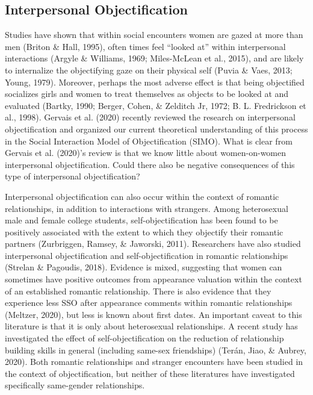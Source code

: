\documentclass[man]{apa6}
\begin{document}
\subsection{Interpersonal
Objectification}\label{interpersonal-objectification}

Studies have shown that within social encounters women are gazed at more
than men (Briton \& Hall, 1995), often times feel \enquote{looked at}
within interpersonal interactions (Argyle \& Williams, 1969;
Miles-McLean et al., 2015), and are likely to internalize the
objectifying gaze on their physical self (Puvia \& Vaes, 2013; Young,
1979). Moreover, perhaps the most adverse effect is that being
objectified socializes girls and women to treat themselves as objects to
be looked at and evaluated (Bartky, 1990; Berger, Cohen, \& Zelditch Jr,
1972; B. L. Fredrickson et al., 1998). Gervais et al. (2020) recently
reviewed the research on interpersonal objectification and organized our
current theoretical understanding of this process in the Social
Interaction Model of Objectification (SIMO). What is clear from Gervais
et al. (2020)'s review is that we know little about women-on-women
interpersonal objectification. Could there also be negative consequences
of this type of interpersonal objectification?

Interpersonal objectification can also occur within the context of
romantic relationships, in addition to interactions with strangers.
Among heterosexual male and female college students,
self-objectification has been found to be positively associated with the
extent to which they objectify their romantic partners (Zurbriggen,
Ramsey, \& Jaworski, 2011). Researchers have also studied interpersonal
objectification and self-objectification in romantic relationships
(Strelan \& Pagoudis, 2018). Evidence is mixed, suggesting that women
can sometimes have positive outcomes from appearance valuation within
the context of an established romantic relationship. There is also
evidence that they experience less SSO after appearance comments within
romantic relationships (Meltzer, 2020), but less is known about first
dates. An important caveat to this literature is that it is only about
heterosexual relationships. A recent study has investigated the effect
of self-objectification on the reduction of relationship building skills
in general (including same-sex friendships) (Terán, Jiao, \& Aubrey,
2020). Both romantic relationships and stranger encounters have been
studied in the context of objectification, but neither of these
literatures have investigated specifically same-gender relationships.
\end{document}
